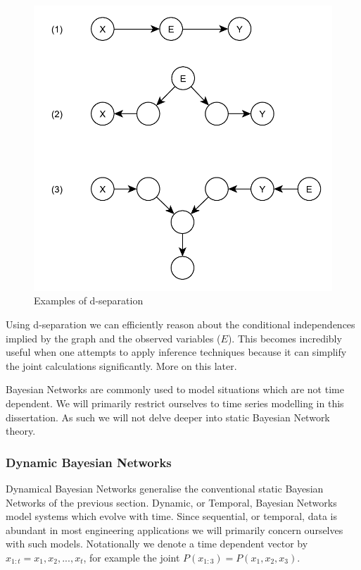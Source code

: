 \documentclass[../masters.tex]{subfiles}
\begin{document}
\begin{figure}[H] 
\centering
\includegraphics[scale=0.5]{dsep.pdf}
\caption{Examples of d-separation}
\label{fig_dsep}
\end{figure}
Using d-separation we can efficiently reason about the conditional independences implied by the graph and the observed variables ($E$). This becomes incredibly useful when one attempts to apply inference techniques because it can simplify the joint calculations significantly. More on this later.

Bayesian Networks are commonly used to model situations which are not time dependent. We will primarily restrict ourselves to time series modelling in this dissertation. As such we will not delve deeper into static Bayesian Network theory.

\subsubsection{Dynamic Bayesian Networks}
Dynamical Bayesian Networks generalise the conventional static Bayesian Networks of the previous section. Dynamic, or Temporal, Bayesian Networks model systems which evolve with time. Since sequential, or temporal, data is abundant in most engineering applications we will primarily concern ourselves with such models. Notationally we denote a time dependent vector by $x_{1:t}=x_1,x_2,...,x_t$, for example the joint $P(x_{1:3})=P(x_1,x_2,x_3)$.
\end{document}
